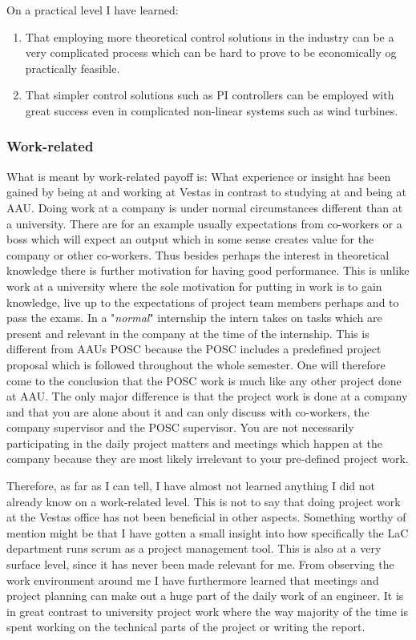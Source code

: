 On a practical level I have learned:
\begin{enumerate}
	\item That employing more theoretical control solutions in the industry can be a very complicated process which can be hard to prove to be economically og practically feasible. 
	\item That simpler control solutions such as PI controllers can be employed with great success even in complicated non-linear systems such as wind turbines.
\end{enumerate}

\subsubsection{Work-related}
What is meant by work-related payoff is: What experience or insight has been gained by being at and working at Vestas in contrast to studying at and being at AAU. Doing work at a company is under normal circumstances different than at a university. There are for an example usually expectations from co-workers or a boss which will expect an output which in some sense creates value for the company or other co-workers. Thus besides perhaps the interest in theoretical knowledge there is further motivation for having good performance. This is unlike work at a university where the sole motivation for putting in work is to gain knowledge, live up to the expectations of project team members perhaps and to pass the exams. In a "\textit{normal}" internship the intern takes on tasks which are present and relevant in the company at the time of the internship. This is different from AAUs POSC because the POSC includes a predefined project proposal which is followed throughout the whole semester. One will therefore come to the conclusion that the POSC work is much like any other project done at AAU. The only major difference is that the project work is done at a company and that you are alone about it and can only discuss with co-workers, the company supervisor and the POSC supervisor. You are not necessarily participating in the daily project matters and meetings which happen at the company because they are most likely irrelevant to your pre-defined project work.

Therefore, as far as I can tell, I have almost not learned anything I did not already know on a work-related level. This is not to say that doing project work at the Vestas office has not been beneficial in other aspects. Something worthy of mention might be that I have gotten a small insight into how specifically the LaC department runs scrum as a project management tool. This is also at a very surface level, since it has never been made relevant for me. From observing the work environment around me I have furthermore learned that meetings and project planning can make out a huge part of the daily work of an engineer. It is in great contrast to university project work where the way majority of the time is spent working on the technical parts of the project or writing the report.

